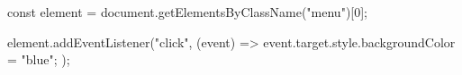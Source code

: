 const element = document.getElementsByClassName("menu")[0];

element.addEventListener("click", (event) => {
    event.target.style.backgroundColor = "blue";
});
